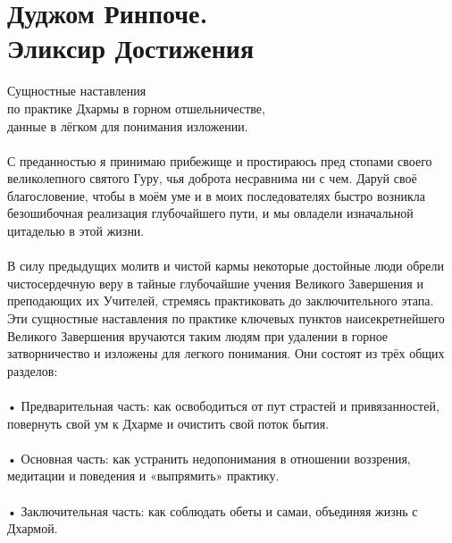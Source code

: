 \section{Дуджом Ринпоче.\\Эликсир Достижения}

\large Сущностные наставления \\
по практике Дхармы в горном отшельничестве, \\
данные в лёгком для понимания изложении. \normalsize
\\
\\
С преданностью я принимаю прибежище и простираюсь пред
стопами своего великолепного святого Гуру, чья доброта
несравнима ни с чем. Даруй своё благословение, чтобы в
моём уме и в моих последователях быстро возникла безошибочная
реализация глубочайшего пути, и мы овладели изначальной
цитаделью в этой жизни.\\
\\
В силу предыдущих молитв и чистой кармы некоторые
достойные люди обрели чистосердечную веру в тайные
глубочайшие учения Великого Завершения и преподающих
их Учителей, стремясь практиковать до заключительного
этапа. Эти сущностные наставления по практике ключевых
пунктов наисекретнейшего Великого Завершения вручаются
таким людям при удалении в горное затворничество и изложены
для легкого понимания. Они состоят из трёх общих разделов:\\
\\
• Предварительная часть: как освободиться от пут страстей и привязанностей, повернуть свой ум к Дхарме и очистить свой поток бытия.\\
\\
• Основная часть: как устранить недопонимания в отношении воззрения, медитации и поведения и «выпрямить» практику.\\
\\
• Заключительная часть: как соблюдать обеты и самаи, объединяя жизнь с Дхармой.\\
\\
\newpage
